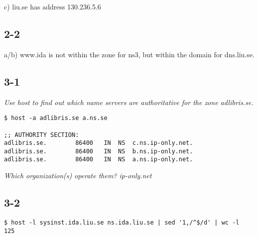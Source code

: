 c) liu.se has address 130.236.5.6

\subsection{2-2}

a/b) www.ida is not within the zone for ns3, but within the domain for dns.liu.se.

\subsection{3-1}

\em Use host to find out which name servers are authoritative for the zone adlibris.se. \em
\begin{verbatim}
$ host -a adlibris.se a.ns.se

;; AUTHORITY SECTION:
adlibris.se.		86400	IN	NS	c.ns.ip-only.net.
adlibris.se.		86400	IN	NS	b.ns.ip-only.net.
adlibris.se.		86400	IN	NS	a.ns.ip-only.net.
\end{verbatim}

\em Which organization(s) operate them?\em
ip-only.net

\subsection{3-2}

\verb=$ host -l sysinst.ida.liu.se ns.ida.liu.se | sed '1,/^$/d' | wc -l=\\
\verb=125=




